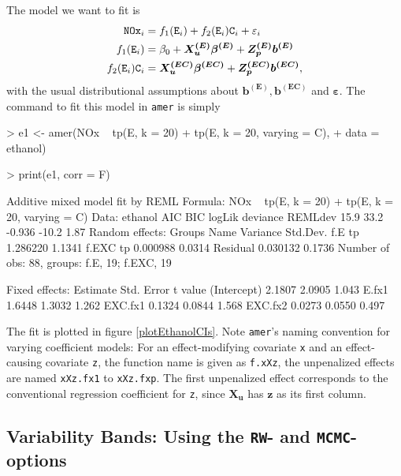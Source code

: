 \documentclass[12pt]{article}
\newenvironment{Schunk}{}{}
\newcommand{\code}[1]{\texttt{\small{#1}}}
\newcommand{\eps}{\varepsilon}
\begin{document}
The model we want to fit is
\begin{align*}
\text{\texttt{NOx}}_i &= f_1(\text{\texttt{E}}_i) + f_2(\text{\texttt{E}}_i)\text{\texttt{C}}_i + \eps_i \\
f_1(\text{\texttt{E}}_i) &= \beta_0 + \bm{X^{(E)}_{u}\beta^{(E)}} + \bm{Z^{(E)}_{p} b^{(E)}} \\
f_2(\text{\texttt{E}}_i)\text{\texttt{C}}_i &=
\bm{X^{(EC)}_{u}\beta^{(EC)}} + \bm{Z^{(EC)}_{p} b^{(EC)}},
\end{align*}
with the usual distributional assumptions about
$\bm{b^{(E)}},\bm{b^{(EC)}}$ and $\bm\eps$. The command to fit this
model in \code{amer} is simply
\begin{Schunk}
\begin{Sinput}
> e1 <- amer(NOx ~ tp(E, k = 20) + tp(E, k = 20, varying = C), 
+     data = ethanol)
\end{Sinput}
\end{Schunk}
\begin{Schunk}
\begin{Sinput}
> print(e1, corr = F)
\end{Sinput}
\begin{Soutput}
Additive mixed model fit by REML 
Formula: NOx ~ tp(E, k = 20) + tp(E, k = 20, varying = C) 
   Data: ethanol 
  AIC  BIC logLik deviance REMLdev
 15.9 33.2 -0.936    -10.2    1.87
Random effects:
 Groups   Name Variance Std.Dev.
 f.E      tp   1.286220 1.1341  
 f.EXC    tp   0.000988 0.0314  
 Residual      0.030132 0.1736  
Number of obs: 88, groups: f.E, 19; f.EXC, 19

Fixed effects:
            Estimate Std. Error t value
(Intercept)   2.1807     2.0905   1.043
E.fx1         1.6448     1.3032   1.262
EXC.fx1       0.1324     0.0844   1.568
EXC.fx2       0.0273     0.0550   0.497
\end{Soutput}
\end{Schunk}
The fit is plotted in figure \ref{plotEthanolCIs}. Note \code{amer}'s naming
convention for varying coefficient models: For an effect-modifying
covariate \code{x} and an effect-causing covariate \code{z}, the function name is
given as \code{f.xXz}, the unpenalized effects are named \code{xXz.fx1} to
\code{xXz.fxp}. The first unpenalized effect corresponds to the conventional
regression coefficient for \code{z}, since $\bm{X_u}$ has $\bm{z}$ as its first
column.

\clearpage
\subsection{Variability Bands: Using the \texttt{RW}- and  \texttt{MCMC}-options}\label{VarBands}
\end{document}
